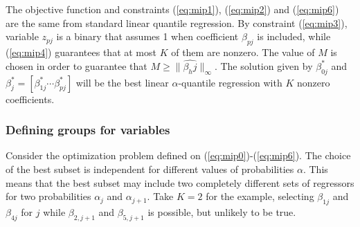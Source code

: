 The objective function and constraints (\ref{eq:mip1}), (\ref{eq:mip2}) and (\ref{eq:mip6}) are the same from standard linear quantile regression. 
By constraint (\ref{eq:mip3}), variable $z_{p j}$ is a binary that assumes 1 when coefficient $\beta_{p j}$ is included, while (\ref{eq:mip4}) guarantees that at most $K$ of them are nonzero.
The value of $M$ is chosen in order to guarantee that $M \geq \|\hat{\beta_hj}\|_{\infty}$. The solution given by $\beta_{0j}^*$ and $\beta_j^* = [ \beta_{1 j}^* \cdots \beta_{pj}^* ]$ will be the best linear $\alpha$-quantile regression with $K$ nonzero coefficients.  

\subsubsection{Defining groups for variables}

Consider the optimization problem defined on (\ref{eq:mip0})-(\ref{eq:mip6}). The choice of the best subset is independent for different values of probabilities $\alpha$. This means that the best subset may include two completely different sets of regressors for two probabilities $\alpha_j$ and $\alpha_{j+1}$. Take $K=2$ for the example, selecting $\beta_{1j}$ and $\beta_{4j}$ for $j$ while $\beta_{2,j+1}$ and $\beta_{5,j+1}$ is possible, but unlikely to be true.  

